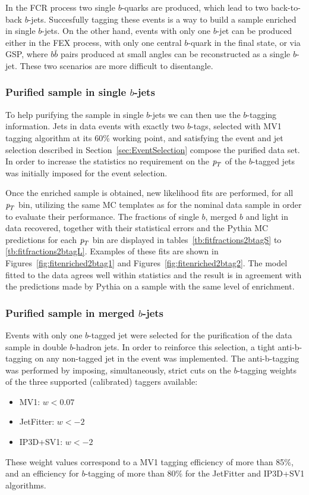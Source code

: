 In the FCR process two single $b$-quarks are produced, which lead to two back-to-back $b$-jets. Succesfully tagging these events is a way to build a sample enriched in single $b$-jets.  On the other hand, events with only one $b$-jet can be produced either in the FEX process, with only one central $b$-quark in the final state, or via GSP, where $b\bar{b}$ pairs produced at small angles can be reconstructed as a single $b$-jet. These two scenarios are more difficult to disentangle. %

\subsubsection{Purified sample in single $b$-jets}

To help purifying the sample in single $b$-jets we can then use the $b$-tagging information. Jets in data events with exactly two $b$-tags, selected with MV1 tagging algorithm at its 60\% working point, and satisfying the event and jet selection described in Section~\ref{sec:EventSelection} compose the purified data set.  In order to increase the statistics no requirement on the ${\emph{p}_{T}}$ of the $b$-tagged jets was initially imposed for the event selection. 

Once the enriched sample is obtained, new likelihood fits are performed, for all ${\emph{p}_{T}}$ bin, utilizing the same MC templates as for the nominal data sample in order to evaluate their performance.  
The fractions of single $b$, merged $b$ and light in data recovered, together with their statistical errors and the {\sc Pythia} MC predictions for each ${\emph{p}_{T}}$ bin are displayed in tables~\ref{tb:fitfractions2btagS} to \ref{tb:fitfractions2btagL}.   Examples of these fits are shown  in  Figures~\ref{fig:fitenriched2btag1} and Figures~\ref{fig:fitenriched2btag2}.  The model fitted to the data agrees well within statistics and the result is in agreement with the predictions made by {\sc Pythia} on a sample with the same level of enrichment.  

\subsubsection{Purified sample in merged $b$-jets}

Events with only one $b$-tagged jet were selected for the purification of the data sample in double $b$-hadron jets.  In order to reinforce this selection, a tight anti-b-tagging on any non-tagged jet in the event was implemented.  The anti-b-tagging was performed by imposing, simultaneously, strict cuts on the $b$-tagging weights of the three supported (calibrated) taggers available:
%
\begin{itemize}
\item
MV1:  $w < 0.07$  
\item
JetFitter:  $w < -2$
\item
IP3D+SV1:  $w < -2$
\end{itemize}
%
These weight values correspond to a MV1 tagging efficiency of more than 85\%, and an efficiency for $b$-tagging of more than 80\% for the JetFitter and IP3D+SV1 algorithms. 

